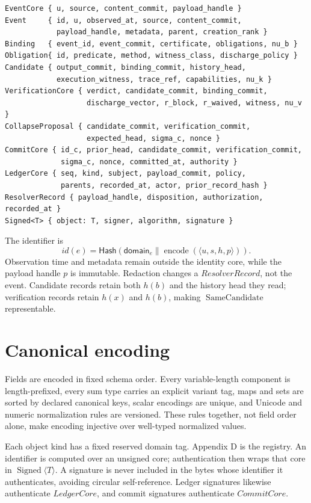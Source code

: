 \documentclass[11pt,openany]{book}
\newcommand{\Hash}{\mathsf{Hash}}
\begin{document}
\begin{scriptsize}
\begin{verbatim}
EventCore { u, source, content_commit, payload_handle }
Event     { id, u, observed_at, source, content_commit,
            payload_handle, metadata, parent, creation_rank }
Binding   { event_id, event_commit, certificate, obligations, nu_b }
Obligation{ id, predicate, method, witness_class, discharge_policy }
Candidate { output_commit, binding_commit, history_head,
            execution_witness, trace_ref, capabilities, nu_k }
VerificationCore { verdict, candidate_commit, binding_commit,
                   discharge_vector, r_block, r_waived, witness, nu_v }
CollapseProposal { candidate_commit, verification_commit,
                   expected_head, sigma_c, nonce }
CommitCore { id_c, prior_head, candidate_commit, verification_commit,
             sigma_c, nonce, committed_at, authority }
LedgerCore { seq, kind, subject, payload_commit, policy,
             parents, recorded_at, actor, prior_record_hash }
ResolverRecord { payload_handle, disposition, authorization, recorded_at }
Signed<T> { object: T, signer, algorithm, signature }
\end{verbatim}
\end{scriptsize}

The identifier is
\[
 id(e)=\Hash(\mathsf{domain}_e\parallel
             \operatorname{encode}(\langle u,s,h,p\rangle)).
\]
Observation time and metadata remain outside the identity core, while the
payload handle \(p\) is immutable. Redaction changes a \(ResolverRecord\), not
the event. Candidate records retain both \(h(b)\) and the history head they
read; verification records retain \(h(x)\) and \(h(b)\), making
\(\operatorname{SameCandidate}\) representable.

\section{Canonical encoding}
Fields are encoded in fixed schema order. Every variable-length component is
length-prefixed, every sum type carries an explicit variant tag, maps and sets
are sorted by declared canonical keys, scalar encodings are unique, and Unicode
and numeric normalization rules are versioned. These rules together, not field
order alone, make encoding injective over well-typed normalized values.

Each object kind has a fixed reserved domain tag. Appendix D is the registry.
An identifier is computed over an unsigned core; authentication then wraps
that core in \(\operatorname{Signed}\langle T\rangle\). A signature is never
included in the bytes whose identifier it authenticates, avoiding circular
self-reference. Ledger signatures likewise authenticate \(LedgerCore\), and
commit signatures authenticate \(CommitCore\).
\end{document}
